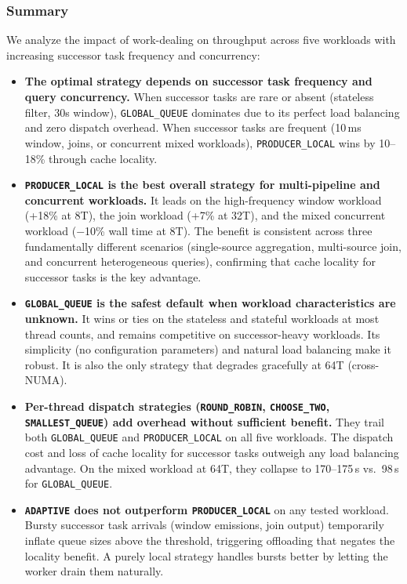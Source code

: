 \subsubsection{Summary}
We analyze the impact of work-dealing on throughput across five workloads with increasing successor task frequency and concurrency:


\begin{itemize}
    \item \textbf{The optimal strategy depends on successor task frequency and query concurrency.}
    When successor tasks are rare or absent (stateless filter, 30s window), \texttt{GLOBAL\_QUEUE} dominates due to its perfect load balancing and zero dispatch overhead.
    When successor tasks are frequent (10\,ms window, joins, or concurrent mixed workloads), \texttt{PRODUCER\_LOCAL} wins by 10--18\% through cache locality.

    \item \textbf{\texttt{PRODUCER\_LOCAL} is the best overall strategy for multi-pipeline and concurrent workloads.}
    It leads on the high-frequency window workload (+18\% at 8T), the join workload (+7\% at 32T), and the mixed concurrent workload ($-$10\% wall time at 8T).
    The benefit is consistent across three fundamentally different scenarios (single-source aggregation, multi-source join, and concurrent heterogeneous queries), confirming that cache locality for successor tasks is the key advantage.

    \item \textbf{\texttt{GLOBAL\_QUEUE} is the safest default when workload characteristics are unknown.}
    It wins or ties on the stateless and stateful workloads at most thread counts, and remains competitive on successor-heavy workloads.
    Its simplicity (no configuration parameters) and natural load balancing make it robust.
    It is also the only strategy that degrades gracefully at 64T (cross-NUMA).

    \item \textbf{Per-thread dispatch strategies (\texttt{ROUND\_ROBIN}, \texttt{CHOOSE\_TWO}, \texttt{SMALLEST\_QUEUE}) add overhead without sufficient benefit.}
    They trail both \texttt{GLOBAL\_QUEUE} and \texttt{PRODUCER\_LOCAL} on all five workloads.
    The dispatch cost and loss of cache locality for successor tasks outweigh any load balancing advantage.
    On the mixed workload at 64T, they collapse to 170--175\,s vs.\ 98\,s for \texttt{GLOBAL\_QUEUE}.

    \item \textbf{\texttt{ADAPTIVE} does not outperform \texttt{PRODUCER\_LOCAL}} on any tested workload.
    Bursty successor task arrivals (window emissions, join output) temporarily inflate queue sizes above the threshold, triggering offloading that negates the locality benefit.
    A purely local strategy handles bursts better by letting the worker drain them naturally.


\end{itemize}
